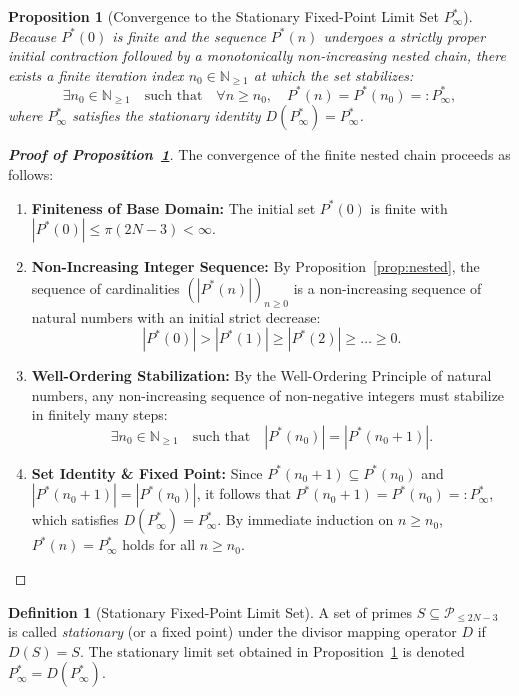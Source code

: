 \documentclass[11pt,a4paper]{article}
\newtheorem{proposition}[theorem]{Proposition}
\theoremstyle{definition}
\newtheorem{definition}[theorem]{Definition}
\begin{document}
\begin{proposition}[Convergence to the Stationary Fixed-Point Limit Set $P^*_\infty$]
\label{prop:convergence}
Because $P^*(0)$ is finite and the sequence $P^*(n)$ undergoes a strictly proper initial contraction followed by a monotonically non-increasing nested chain, there exists a finite iteration index $n_0 \in \mathbb{N}_{\ge 1}$ at which the set stabilizes:
\[
\exists n_0 \in \mathbb{N}_{\ge 1} \quad \text{such that} \quad \forall n \ge n_0, \quad P^*(n) = P^*(n_0) =: P^*_\infty,
\]
where $P^*_\infty$ satisfies the stationary identity $D(P^*_\infty) = P^*_\infty$.
\end{proposition}
\begin{proof}[\textbf{Proof of Proposition~\ref{prop:convergence}}]
The convergence of the finite nested chain proceeds as follows:
\begin{enumerate}
    \item \textbf{Finiteness of Base Domain:} The initial set $P^*(0)$ is finite with $|P^*(0)| \le \pi(2N-3) < \infty$.
    \item \textbf{Non-Increasing Integer Sequence:} By Proposition~\ref{prop:nested}, the sequence of cardinalities $(|P^*(n)|)_{n \ge 0}$ is a non-increasing sequence of natural numbers with an initial strict decrease:
    \[
    |P^*(0)| > |P^*(1)| \ge |P^*(2)| \ge \dots \ge 0.
    \]
    \item \textbf{Well-Ordering Stabilization:} By the Well-Ordering Principle of natural numbers, any non-increasing sequence of non-negative integers must stabilize in finitely many steps:
    \[
    \exists n_0 \in \mathbb{N}_{\ge 1} \quad \text{such that} \quad |P^*(n_0)| = |P^*(n_0+1)|.
    \]
    \item \textbf{Set Identity \& Fixed Point:} Since $P^*(n_0+1) \subseteq P^*(n_0)$ and $|P^*(n_0+1)| = |P^*(n_0)|$, it follows that $P^*(n_0+1) = P^*(n_0) =: P^*_\infty$, which satisfies $D(P^*_\infty) = P^*_\infty$. By immediate induction on $n \ge n_0$, $P^*(n) = P^*_\infty$ holds for all $n \ge n_0$.
\end{enumerate}
\end{proof}

\begin{definition}[Stationary Fixed-Point Limit Set]
\label{def:limit_set}
A set of primes $S \subseteq \mathcal{P}_{\le 2N-3}$ is called \textit{stationary} (or a fixed point) under the divisor mapping operator $D$ if $D(S) = S$. The stationary limit set obtained in Proposition~\ref{prop:convergence} is denoted $P^*_\infty = D(P^*_\infty)$.
\end{definition}
\end{document}
